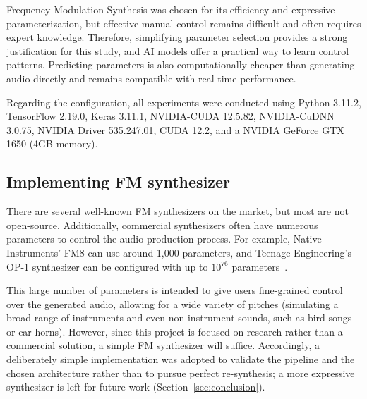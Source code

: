 \documentclass[10pt,conference]{IEEEtran}
\begin{document}
Frequency Modulation Synthesis was chosen for its efficiency and expressive parameterization, but effective manual control remains difficult and often requires expert knowledge. Therefore, simplifying parameter selection provides a strong justification for this study, and AI models offer a practical way to learn control patterns. Predicting parameters is also computationally cheaper than generating audio directly and remains compatible with real-time performance.

Regarding the configuration, all experiments were conducted using Python 3.11.2, TensorFlow 2.19.0, Keras 3.11.1, NVIDIA-CUDA 12.5.82, NVIDIA-CuDNN 3.0.75, NVIDIA Driver 535.247.01, CUDA 12.2, and a NVIDIA GeForce GTX 1650 (4GB memory).


\subsection{Implementing FM synthesizer}

There are several well-known FM synthesizers on the market, but most are not open-source. Additionally, commercial synthesizers often have numerous parameters to control the audio production process. For example, Native Instruments' FM8 can use around 1,000 parameters, and Teenage Engineering’s OP-1 synthesizer can be configured with up to $10^{76}$ parameters~\cite{claesson2021resynthesis}.

This large number of parameters is intended to give users fine-grained control over the generated audio, allowing for a wide variety of pitches (simulating a broad range of instruments and even non-instrument sounds, such as bird songs or car horns). However, since this project is focused on research rather than a commercial solution, a simple FM synthesizer will suffice. Accordingly, a deliberately simple implementation was adopted to validate the pipeline and the chosen architecture rather than to pursue perfect re-synthesis; a more expressive synthesizer is left for future work (Section~\ref{sec:conclusion}).
\end{document}
